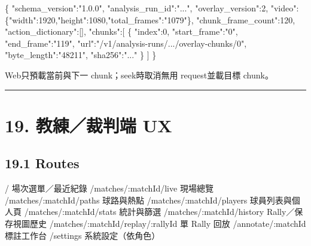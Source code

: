 \documentclass[
  9pt,
  a4paper,
]{article}
\newenvironment{Shaded}{}{}
\newcommand{\DataTypeTok}[1]{\textcolor[rgb]{0.56,0.13,0.00}{#1}}
\newcommand{\DecValTok}[1]{\textcolor[rgb]{0.25,0.63,0.44}{#1}}
\newcommand{\FunctionTok}[1]{\textcolor[rgb]{0.02,0.16,0.49}{#1}}
\newcommand{\NormalTok}[1]{#1}
\newcommand{\OtherTok}[1]{\textcolor[rgb]{0.00,0.44,0.13}{#1}}
\newcommand{\StringTok}[1]{\textcolor[rgb]{0.25,0.44,0.63}{#1}}
\begin{document}
\begin{Shaded}
\begin{Highlighting}[]
\FunctionTok{\{}
  \DataTypeTok{"schema\_\allowbreak{}version"}\FunctionTok{:}\StringTok{"1.0.0"}\FunctionTok{,}
  \DataTypeTok{"analysis\_\allowbreak{}run\_\allowbreak{}id"}\FunctionTok{:}\StringTok{"..."}\FunctionTok{,}
  \DataTypeTok{"overlay\_\allowbreak{}version"}\FunctionTok{:}\DecValTok{2}\FunctionTok{,}
  \DataTypeTok{"video"}\FunctionTok{:\{}\DataTypeTok{"width"}\FunctionTok{:}\DecValTok{1920}\FunctionTok{,}\DataTypeTok{"height"}\FunctionTok{:}\DecValTok{1080}\FunctionTok{,}\DataTypeTok{"total\_\allowbreak{}frames"}\FunctionTok{:}\StringTok{"1079"}\FunctionTok{\},}
  \DataTypeTok{"chunk\_\allowbreak{}frame\_\allowbreak{}count"}\FunctionTok{:}\DecValTok{120}\FunctionTok{,}
  \DataTypeTok{"action\_\allowbreak{}dictionary"}\FunctionTok{:}\OtherTok{[]}\FunctionTok{,}
  \DataTypeTok{"chunks"}\FunctionTok{:}\OtherTok{[}
    \FunctionTok{\{}
      \DataTypeTok{"index"}\FunctionTok{:}\DecValTok{0}\FunctionTok{,}
      \DataTypeTok{"start\_\allowbreak{}frame"}\FunctionTok{:}\StringTok{"0"}\FunctionTok{,}
      \DataTypeTok{"end\_\allowbreak{}frame"}\FunctionTok{:}\StringTok{"119"}\FunctionTok{,}
      \DataTypeTok{"url"}\FunctionTok{:}\StringTok{"/v1/analysis{-}runs/.../overlay{-}chunks/0"}\FunctionTok{,}
      \DataTypeTok{"byte\_\allowbreak{}length"}\FunctionTok{:}\StringTok{"48211"}\FunctionTok{,}
      \DataTypeTok{"sha256"}\FunctionTok{:}\StringTok{"..."}
    \FunctionTok{\}}
  \OtherTok{]}
\FunctionTok{\}}
\end{Highlighting}
\end{Shaded}

Web只預載當前與下一 chunk；seek時取消無用 request並載目標 chunk。

\begin{center}\rule{0.5\linewidth}{0.5pt}\end{center}

\section{19. 教練／裁判端
UX}\label{19-ux6559ux7df4ux88c1ux5224ux7aef-ux}

\subsection{19.1 Routes}\label{191-routes}

\begin{Shaded}
\begin{Highlighting}[]
\NormalTok{/                         場次選單／最近紀錄}
\NormalTok{/matches/:matchId/live    現場總覽}
\NormalTok{/matches/:matchId/paths   球路與熱點}
\NormalTok{/matches/:matchId/players 球員列表與個人頁}
\NormalTok{/matches/:matchId/stats   統計與篩選}
\NormalTok{/matches/:matchId/history Rally／保存視圖歷史}
\NormalTok{/matches/:matchId/replay/:rallyId  單 Rally 回放}
\NormalTok{/annotate/:matchId        標註工作台}
\NormalTok{/settings                 系統設定（依角色）}
\end{Highlighting}
\end{Shaded}
\end{document}
